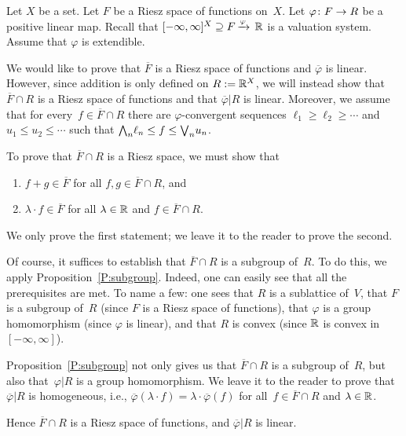 \documentclass[main.tex]{subfiles}
\begin{document}
%
%
\begin{ex}
\label{E:riesz-space-ext}
Let $X$ be a set.
Let $F$ be a Riesz space of functions on~$X$.
Let $\varphi\colon F\rightarrow R$ be a positive linear map.
Recall that $[-\infty,\infty]^X \supseteq F\,\smash{\xrightarrow{\varphi}\,\mathbb{R}}$
is a valuation system.
Assume that $\varphi$ is extendible.

We would like to prove that $\overline F$ is a Riesz space of functions
and $\overline\varphi$ is linear.
However, since addition is only defined on $R:=\mathbb{R}^X$,
we will instead show that
$\overline F\cap R$ is a Riesz space
of functions and that $\overline\varphi|R$ is linear.
Moreover,
we assume
that for every~$f\in\overline F \cap R$
there are $\varphi$-convergent sequences
 $\ell_1 \geq \ell_2 \geq \dotsb$
and $u_1 \leq u_2 \leq \dotsb$
such that $\textstyle{\bigwedge}_n \ell_n \leq f \leq \textstyle{\bigvee}_n u_n$.

To prove that $\overline F \cap R$ is a Riesz space,
we must show that
\begin{enumerate}
\item
 $f+g\in \overline F$ 
for all $f,g\in \overline F \cap R$, and

\item
$\lambda \cdot f\in \overline F$
for all $\lambda\in \mathbb{R}$ and $f\in \overline F\cap R$.
\end{enumerate}
We only prove the first statement;
we leave it to the reader to prove the second.

Of course,
it suffices to establish that $\overline F\cap R$
is a subgroup of~$R$.
To do this,
we apply Proposition~\ref{P:subgroup}.
Indeed, one can easily
see that all the prerequisites are met.
To name a few: one sees that
$R$ is a sublattice of~$V$,
that $F$ is a subgroup of~$R$ (since $F$ is a Riesz space of functions),
that $\varphi$ is a group homomorphism (since $\varphi$ is linear),
and that $R$ is convex (since $\mathbb{R}$ is convex in $[-\infty,\infty]$).

Proposition~\ref{P:subgroup} not only gives us that $\overline F \cap R$
is a subgroup of~$R$, but
also that~$\varphi|R$ is a group homomorphism.
We leave it to the reader to prove that
$\overline\varphi|R$ is homogeneous,
i.e., $\overline\varphi(\lambda\cdot f) = \lambda \cdot \overline\varphi(f)$
for all~$f\in \overline F \cap R$ and $\lambda \in \mathbb{R}$.

Hence $\overline F\cap R$
is a Riesz space of functions, and $\overline \varphi |R$ is linear.
\end{ex}
\end{document}
